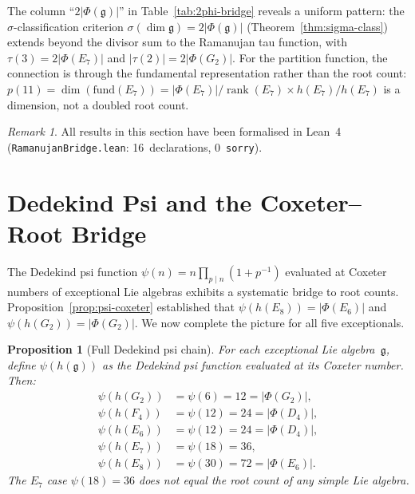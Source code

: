 \documentclass[11pt]{amsart}
\theoremstyle{plain}
\newtheorem{proposition}[theorem]{Proposition}
\theoremstyle{definition}
\theoremstyle{remark}
\newtheorem{remark}[theorem]{Remark}
\newcommand{\fg}{\mathfrak{g}}
\renewcommand{\Phi}{\varPhi}
\newcommand{\rank}{\operatorname{rank}}
\begin{document}
The column ``$2|\Phi(\fg)|$'' in Table~\ref{tab:2phi-bridge} reveals
a uniform pattern: the $\sigma$-classification criterion
$\sigma(\dim\fg) = 2|\Phi(\fg)|$ (Theorem~\ref{thm:sigma-class})
extends beyond the divisor sum to the Ramanujan tau function, with
$\tau(3) = 2|\Phi(E_7)|$ and $|\tau(2)| = 2|\Phi(G_2)|$.
For the partition function, the connection is through the fundamental
representation rather than the root count:
$p(11) = \dim(\text{fund}(E_7)) = |\Phi(E_7)|/\rank(E_7) \times h(E_7)/h(E_7)$
is a dimension, not a doubled root count.

\begin{remark}\label{rem:ramanujan-lean}
All results in this section have been formalised in Lean~4
(\texttt{RamanujanBridge.lean}: 16~declarations, 0~\texttt{sorry}).
\end{remark}

\section{Dedekind Psi and the Coxeter--Root Bridge}
\label{sec:dedekind-psi}

The Dedekind psi function $\psi(n) = n\prod_{p\mid n}(1+p^{-1})$
evaluated at Coxeter numbers of exceptional Lie algebras exhibits a
systematic bridge to root counts.
Proposition~\ref{prop:psi-coxeter} established that
$\psi(h(E_8)) = |\Phi(E_6)|$ and $\psi(h(G_2)) = |\Phi(G_2)|$.
We now complete the picture for all five exceptionals.

\begin{proposition}[Full Dedekind psi chain]\label{prop:psi-full-chain}
For each exceptional Lie algebra~$\fg$, define
$\psi(h(\fg))$ as the Dedekind psi function evaluated at its Coxeter
number.  Then:
\begin{align*}
  \psi(h(G_2)) &= \psi(6)  = 12  = |\Phi(G_2)|, \\
  \psi(h(F_4)) &= \psi(12) = 24  = |\Phi(D_4)|, \\
  \psi(h(E_6)) &= \psi(12) = 24  = |\Phi(D_4)|, \\
  \psi(h(E_7)) &= \psi(18) = 36, \\
  \psi(h(E_8)) &= \psi(30) = 72  = |\Phi(E_6)|.
\end{align*}
The $E_7$ case $\psi(18) = 36$ does not equal the root count of any
simple Lie algebra.
\end{proposition}
\end{document}
